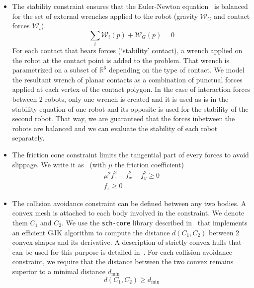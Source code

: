 \begin{itemize}
\item The stability constraint ensures that the Euler-Newton equation~ is balanced for the set of external wrenches applied to the robot (gravity $\mathcal{W}_G$ and contact forces $\mathcal{W}_i$).
\begin{equation}
  \sum_{i}{\mathcal{W}_i(p)} + {\mathcal{W}_G(p)} = 0
  \label{eq:NewtonWrench}
\end{equation}
For each contact that bears forces (`stability' contact), a wrench applied on the robot at the contact point is added to the problem.
That wrench is parametrized on a subset of $\mathbb{R}^6$ depending on the type of contact.
We model the resultant wrench of planar contacts as a combination of punctual forces applied at each vertex of the contact polygon.
In the case of interaction forces between 2 robots, only one wrench is created and it is used as is in the stability equation of one robot and its opposite is used for the stability of the second robot.
That way, we are guaranteed that the forces inbetween the robots are balanced and we can evaluate the stability of each robot separately.

\item The friction cone constraint limits the tangential part of every forces to avoid slippage.
We write it as~ (with $\mu$ the friction coefficient)
\begin{equation}
  \begin{split}
    \mu^2f_z^2-f_x^2-f_y^2 \geq 0 \\
    f_z \geq 0
  \end{split}
  \label{eq:friction}
\end{equation}

\item The collision avoidance constraint can be defined between any two bodies.
A convex mesh is attached to each body involved in the constraint.
We denote them $C_1$ and $C_2$.
We use the {\tt sch-core} library described in~\cite{benallegue:icra:2009} that implements an efficient GJK algorithm to compute the distance $d(C_1,C_2)$ between 2 convex shapes and its derivative.
A description of strictly convex hulls that can be used for this purpose is detailed in~\cite{escande:itro:2014}.
For each collision avoidance constraint, we require that the distance between the two convex remains superior to a minimal distance $d_{\min}$
\begin{equation}
  d(C_1, C_2)\geq d_{\min}
\end{equation}


\end{itemize}
